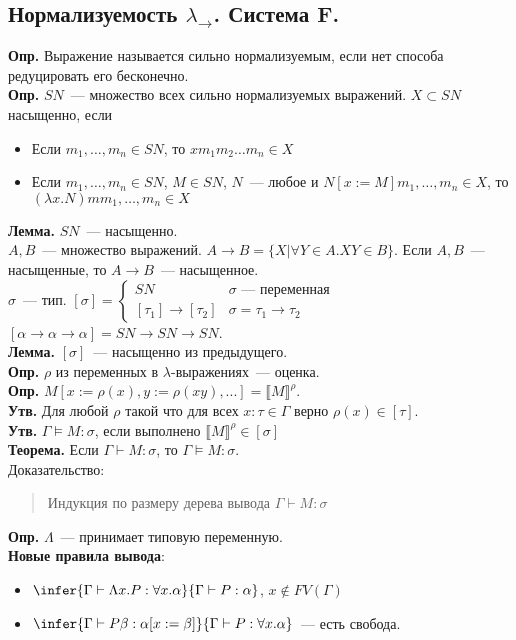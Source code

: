 \documentclass[12pt]{article}
\begin{document}
	\subsection{Нормализуемость $\lambda_{\rightarrow}$. Система F.}
	\textbf{Опр.} Выражение называется сильно нормализуемым, если нет способа редуцировать его бесконечно. \\
	\textbf{Опр.} $SN$~--- множество всех сильно нормализуемых выражений. $X \subset SN$ насыщенно, если
	\begin{itemize}
		\item Если $m_1, \dots, m_n \in SN$, то $x m_1 m_2 \dots m_n \in X$
		\item Если $m_1, \dots, m_n \in SN$, $M \in SN$, $N$~--- любое и $N [x := M] m_1, \dots, m_n \in X$, то $(\lambda x. N) m m_1, \dots, m_n \in X$
	\end{itemize}
	\textbf{Лемма.} $SN$~--- насыщенно. \\
	$A, B$~--- множество выражений. $A \rightarrow B = \{ X | \forall Y \in A. XY \in B \}$. Если $A, B$~--- насыщенные, то $A \rightarrow B$~--- насыщенное. \\
	$\sigma$~--- тип. $[\sigma] = \begin{cases}
		SN & \sigma \text{~--- переменная} \\
		[\tau_1] \rightarrow [\tau_2] & \sigma = \tau_1 \rightarrow \tau_2
	\end{cases}$ \\
	$[\alpha \rightarrow \alpha \rightarrow \alpha] = SN \rightarrow SN \rightarrow SN$. \\
	\textbf{Лемма.} $[\sigma]$~--- насыщенно из предыдущего. \\
	\textbf{Опр.} $\rho$ из переменных в $\lambda$-выражениях~--- оценка. \\
	\textbf{Опр.} $M [x := \rho (x), y := \rho (xy), ...] = \llbracket M \rrbracket ^{\rho}$. \\
	\textbf{Утв.} Для любой $\rho$ такой что для всех $x : \tau \in \Gamma$ верно $\rho (x) \in [\tau]$. \\
	\textbf{Утв.} $\Gamma \vDash M : \sigma$, если выполнено $\llbracket M \rrbracket ^{\rho} \in [\sigma]$ \\
	\textbf{Теорема.} Если $\Gamma \vdash M : \sigma$, то $\Gamma \vDash M : \sigma$. \\
	Доказательство:
	\begin{quote}
		Индукция по размеру дерева вывода $\Gamma \vdash M : \sigma$
	\end{quote}
	\textbf{Опр.} $\Lambda$~--- принимает типовую переменную. \\
	\textbf{Новые правила вывода}:
	\begin{itemize}
		\item $\infer{\Gamma \vdash \Lambda x. P : \forall x. \alpha}{\Gamma \vdash P : \alpha}$, $x \not\in FV(\Gamma)$
		\item $\infer{\Gamma \vdash P \beta : \alpha [x := \beta]}{\Gamma \vdash P : \forall x. \alpha}$~--- есть свобода.
	\end{itemize}
\end{document}
